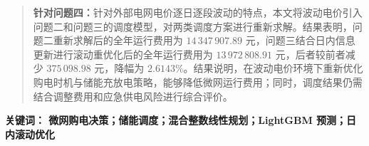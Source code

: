 \documentclass[12pt,a4paper]{article}
\newcommand{\keywordfont}{\bfseries}
\begin{document}
\begin{quotation}
\medskip
\noindent\textbf{针对问题四：}针对外部电网电价逐日逐段波动的特点，本文将波动电价引入问题二和问题三的调度模型，对两类调度方案进行重新求解。结果表明，问题二重新求解后的全年运行费用为 $14\,347\,907.89$ 元，问题三结合日内信息更新进行滚动重优化后的全年运行费用为 $13\,972\,808.91$ 元，后者较前者减少 $375\,098.98$ 元，降幅为 $2.6143\%$。结果说明，在波动电价环境下重新优化购电时机与储能充放电策略，能够降低微网运行费用；同时，调度结果仍需结合调整费用和应急供电风险进行综合评价。

\end{quotation}

\vspace{2em}
\noindent\keywordfont{关键词：} 微网购电决策；储能调度；混合整数线性规划；LightGBM 预测；日内滚动优化
\end{document}
